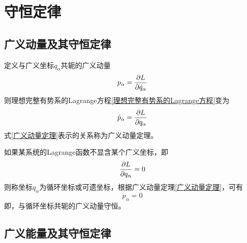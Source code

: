 \section{守恒定律}

\subsection{广义动量及其守恒定律}

定义与广义坐标$q_\alpha$共轭的{\heiti 广义动量}
\begin{equation}
	p_\alpha = \frac{\partial L}{\partial \dot{q}_\alpha}
	\label{广义动量定义}
\end{equation}
则理想完整有势系的Lagrange方程\eqref{理想完整有势系的Lagrange方程}变为
\begin{equation}
	\dot{p}_\alpha = \frac{\partial L}{\partial q_\alpha}
	\label{广义动量定理}
\end{equation}
式\eqref{广义动量定理}表示的关系称为{\heiti 广义动量定理}。

如果某系统的Lagrange函数不显含某个广义坐标，即
\begin{equation*}
	\frac{\partial L}{\partial q_\alpha} = 0
\end{equation*}
则称坐标$q_\alpha$为{\heiti 循环坐标}或{\heiti 可遗坐标}，根据广义动量定理\eqref{广义动量定理}，可有
\begin{equation}
	\dot{p}_\alpha = 0
\end{equation}
即，与循环坐标共轭的广义动量守恒。

\subsection{广义能量及其守恒定律}

